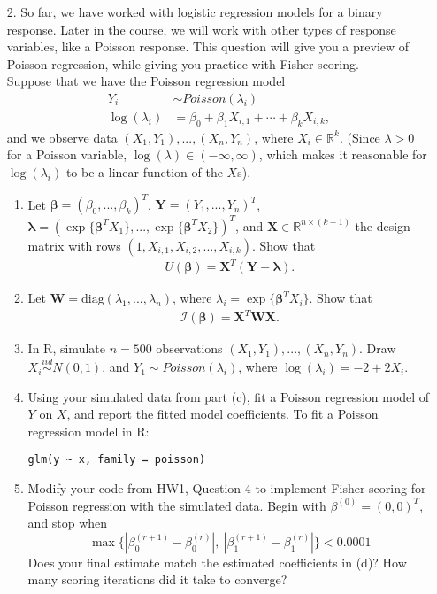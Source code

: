 \documentclass[11pt]{article}
\begin{document}
\begin{enumerate}
\item[2.] So far, we have worked with logistic regression models for a binary response. Later in the course, we will work with other types of response variables, like a Poisson response. This question will give you a preview of Poisson regression, while giving you practice with Fisher scoring. \\

Suppose that we have the Poisson regression model
\begin{align*}
Y_i &\sim Poisson(\lambda_i) \\
\log(\lambda_i) &= \beta_0 + \beta_1X_{i,1} + \cdots + \beta_k X_{i,k},
\end{align*}
and we observe data $(X_1, Y_1),...,(X_n, Y_n)$, where $X_i \in \mathbb{R}^{k}$. (Since $\lambda > 0$ for a Poisson variable, $\log(\lambda) \in (-\infty, \infty)$, which makes it reasonable for $\log(\lambda_i)$ to be a linear function of the $X$s).

\begin{enumerate}
\item Let $\bm{\beta} = (\beta_0,...,\beta_k)^T$, $\bm{Y} = (Y_1,...,Y_n)^T$, $\bm{\lambda} = (\exp\{ \bm{\beta}^T X_1 \}, ..., \exp\{ \bm{\beta}^T X_2 \})^T$, and $\mathbf{X} \in \mathbb{R}^{n \times (k+1)}$ the design matrix with rows $(1, X_{i,1}, X_{i,2}, ..., X_{i,k})$. Show that
\begin{align*}
U(\bm{\beta}) = \mathbf{X}^T(\bm{Y} - \bm{\lambda}).
\end{align*}

\item Let $\bm{W} = \text{diag}(\lambda_1,...,\lambda_n)$, where $\lambda_i = \exp\{ \bm{\beta}^T X_i \}$. Show that
\begin{align*}
\mathcal{I}(\bm{\beta}) = \bm{X}^T \bm{W} \bm{X}.
\end{align*}

\item In R, simulate $n = 500$ observations $(X_1, Y_1),...,(X_n, Y_n)$. Draw $X_i \overset{iid}{\sim} N(0, 1)$, and $Y_1 \sim Poisson(\lambda_i)$, where $\log(\lambda_i) = -2 + 2 X_i$. 

\item Using your simulated data from part (c), fit a Poisson regression model of $Y$ on $X$, and report the fitted model coefficients. To fit a Poisson regression model in R: 

\begin{verbatim}
glm(y ~ x, family = poisson)
\end{verbatim}

\item Modify your code from HW1, Question 4 to implement Fisher scoring for Poisson regression with the simulated data. Begin with $\beta^{(0)} = (0, 0)^T$, and stop when
$$\max \{ |\beta_0^{(r+1)} - \beta_0^{(r)}|, \ |\beta_1^{(r+1)} - \beta_1^{(r)}| \} < 0.0001$$
Does your final estimate match the estimated coefficients in (d)? How many scoring iterations did it take to converge?
\end{enumerate}

\end{enumerate}
\end{document}
